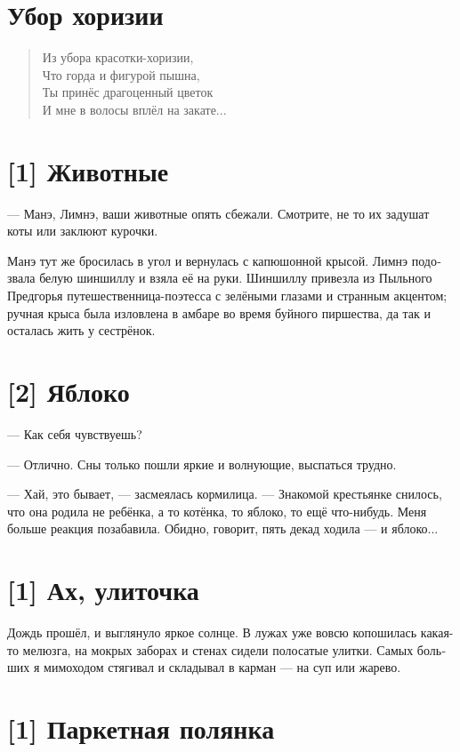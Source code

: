 \documentclass[a4paper,12pt,fleqn]{book}\usepackage{cooltooltips}\usepackage{polyglossia}\setdefaultlanguage[babelshorthands=true]{russian}\setotherlanguage{english}\defaultfontfeatures{Ligatures=TeX,Mapping=tex-text} \usepackage{xcolor}\definecolor{lightgray}{HTML}{bbbbbb}\color{lightgray}\newcommand{\ml}[3]{\textenglish{\textcolor{black}{#3}}}
\begin{document}
{\section{Убор хоризии}

\begin{verse}
Из убора красотки-хоризии,\\
Что горда и фигурой пышна,\\
Ты принёс драгоценный цветок\\
И мне в волосы вплёл на закате...
\end{verse}

\section{[1] Животные}

--- Манэ, Лимнэ, ваши животные опять сбежали.
Смотрите, не то их задушат коты или заклюют курочки.

Манэ тут же бросилась в угол и вернулась с капюшонной крысой.
Лимнэ подозвала белую шиншиллу и взяла её на руки.
Шиншиллу привезла из Пыльного Предгорья путешественница-поэтесса с зелёными глазами и странным акцентом;
ручная крыса была изловлена в амбаре во время буйного пиршества, да так и осталась жить у сестрёнок.

\section{[2] Яблоко}

--- Как себя чувствуешь?

--- Отлично.
Сны только пошли яркие и волнующие, выспаться трудно.

--- Хай, это бывает, --- засмеялась кормилица.
--- Знакомой крестьянке снилось, что она родила не ребёнка, а то котёнка, то яблоко, то ещё что-нибудь.
Меня больше реакция позабавила.
Обидно, говорит, пять декад ходила --- и яблоко...

\section{[1] Ах, улиточка}

Дождь прошёл, и выглянуло яркое солнце.
В лужах уже вовсю копошилась какая-то мелюзга, на мокрых заборах и стенах сидели полосатые улитки.
Самых больших я мимоходом стягивал и складывал в карман --- на суп или жарево.

\section{[1] Паркетная полянка}

}
\end{document}
